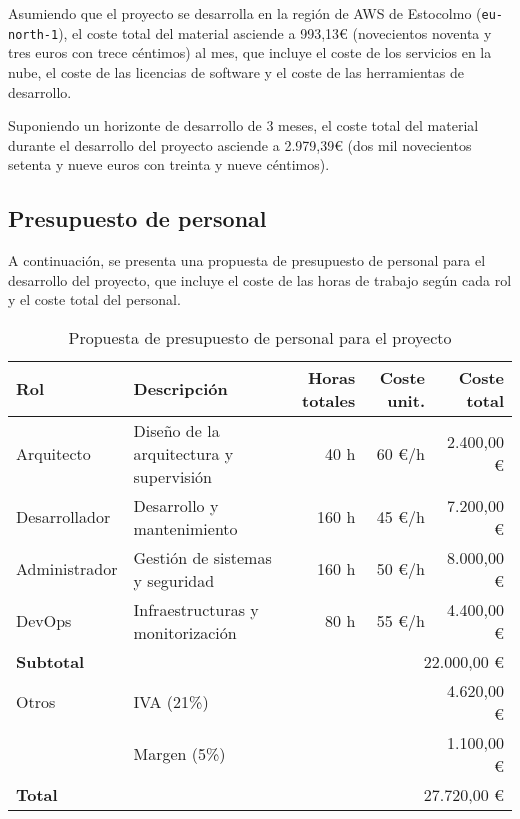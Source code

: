 Asumiendo que el proyecto se desarrolla en la región de AWS de Estocolmo
(\texttt{eu-north-1}), el coste total del material asciende a 993,13€ (novecientos
noventa y tres euros con trece céntimos) al mes, que incluye
el coste de los servicios en la nube, el coste de las licencias de software y el
coste de las herramientas de desarrollo.

Suponiendo un horizonte de desarrollo de 3 meses, el coste total del material
durante el desarrollo del proyecto asciende a 2.979,39€ (dos mil novecientos
setenta y nueve euros con treinta y nueve céntimos).


\newpage{}
\subsection{Presupuesto de personal}\label{subsec:pres_personal}
A continuación, se presenta una propuesta de presupuesto de personal para el
desarrollo del proyecto, que incluye el coste de las horas de trabajo según
cada rol y el coste total del personal.

\begin{table}[H]
	\centering
	\small
	\begin{tabular}{|l|l|r|r|r|}
	\hline
	\textbf{Rol} & \textbf{Descripción} & \textbf{Horas totales} & \textbf{Coste unit.} & \textbf{Coste total} \\
	\hline
	\hline
	Arquitecto & Diseño de la arquitectura y supervisión & 40 h & 60 €/h & 2.400,00 € \\
	\hline
	Desarrollador & Desarrollo y mantenimiento & 160 h & 45 €/h & 7.200,00 € \\
	\hline
	Administrador & Gestión de sistemas y seguridad & 160 h & 50 €/h & 8.000,00 € \\
	\hline
	DevOps & Infraestructuras y monitorización & 80 h & 55 €/h & 4.400,00 € \\
	\hline
	\textbf{Subtotal} & \multicolumn{4}{r|}{22.000,00 €} \\
	\hline
	\hline
	Otros & \multicolumn{3}{|l|}{IVA (21\%)} & 4.620,00 € \\
	 & \multicolumn{3}{|l|}{Margen (5\%)} & 1.100,00 € \\
	\hline
	\textbf{Total} & \multicolumn{4}{r|}{27.720,00 €} \\
	\hline
	\end{tabular}
	\caption{Propuesta de presupuesto de personal para el proyecto}
	\label{tab:presupuesto_personal_aws}
\end{table}

